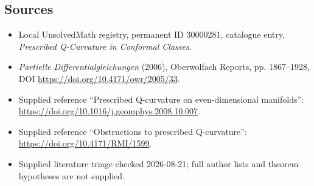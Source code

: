 \documentclass[11pt]{article}
\begin{document}
\subsection{Sources}
\begin{itemize}
\item Local UnsolvedMath registry, permanent ID 30000281, catalogue entry, \emph{Prescribed Q-Curvature in Conformal Classes}.
\item \emph{Partielle Differentialgleichungen} (2006), Oberwolfach Reports, pp. 1867--1928, DOI \url{https://doi.org/10.4171/owr/2005/33}.
\item Supplied reference ``Prescribed Q-curvature on even-dimensional manifolds'': \url{https://doi.org/10.1016/j.geomphys.2008.10.007}.
\item Supplied reference ``Obstructions to prescribed Q-curvature'': \url{https://doi.org/10.4171/RMI/1599}.
\item Supplied literature triage checked 2026-08-21; full author lists and theorem hypotheses are not supplied.
\end{itemize}
\end{document}
